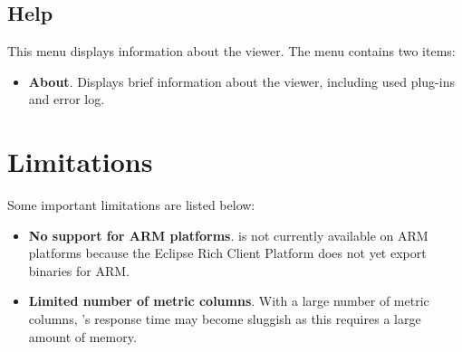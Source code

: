\subsection{Help}

This menu displays information about the viewer. The menu contains two items:
\begin{itemize}

\item \textbf{About}.
  Displays brief information about the viewer, including used plug-ins and error log.

\end{itemize}



\section{Limitations}

Some important \hpcviewer{} limitations are listed below:
\begin{itemize}

\item \textbf{No support for ARM platforms}.
\hpcviewer{} is not currently available on ARM platforms because the Eclipse Rich Client Platform does not yet export binaries for ARM.

\item \textbf{Limited number of metric columns}.
With a large number of metric columns, \hpcviewer{}'s response time may become sluggish as this requires a large amount of memory.


\end{itemize}
